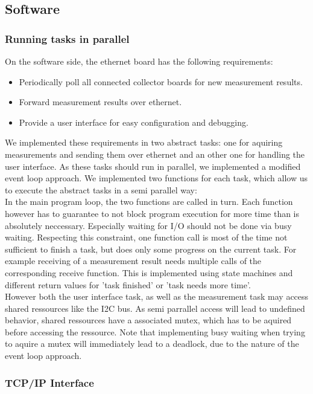 \documentclass[a4paper]{scrreprt}
\begin{document}
\subsection{Software}
\subsubsection{Running tasks in parallel}
On the software side, the ethernet board has the following requirements:
\begin{itemize}
  \item Periodically poll all connected collector boards for new measurement results.
  \item Forward measurement results over ethernet.
  \item Provide a user interface for easy configuration and debugging.
\end{itemize}
We implemented these requirements in two abstract tasks: one for aquiring measurements and sending them
over ethernet and an other one for handling the user interface.
As these tasks should run in parallel, we implemented a modified event loop approach. We
implemented two functions for each task, which allow us to execute the abstract tasks
in a semi parallel way:\\
In the main program loop, the two functions are called in turn. Each function however has to guarantee to
not block program execution for more time than is absolutely neccessary. Especially waiting for I/O
should not be done via busy waiting. Respecting this constraint, one function
call is most of the time not sufficient to finish a task, but does only some progress on the
current task. For example receiving of a measurement result needs multiple calls
of the corresponding receive function. This is implemented using state machines and different
return values for 'task finished' or 'task needs more time'.\\
However both the user interface task, as well as the measurement task may access shared ressources
like the I2C bus. As semi parrallel access will lead to undefined behavior, shared ressources
have a associated mutex, which has to be aquired before accessing the ressource. Note that implementing
busy waiting when trying to aquire a mutex will immediately lead to a deadlock, due to the nature
of the event loop approach.
\subsubsection{TCP/IP Interface}
\end{document}
